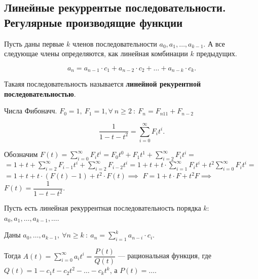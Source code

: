 
\subsection{Линейные рекуррентые последовательности. Регулярные производящие функции}


\begin{definition}

    Пусть даны первые $k$ членов последовательности $a_0, a_1, \dots, a_{k - 1}$.
    А все следующае члены определяются, как линейная комбинации $k$ предыдущих.

    \[a_n = a_{n-1} \cdot c_1 + a_{n-2} \cdot c_2 + \dots + a_{n-k} \cdot c_k. \]

    Такаяя последовательность называется \textbf{линейной рекурентной последовательностью}.
\end{definition}

\begin{example}
    Числа Фибоначч. $F_0 = 1, ~ F_1= 1, \forall ~ n \geqslant 2 ~:~ F_n = F_{n 1 1} + F_{n - 2}$

    \[
        \dfrac{1}{1 - t - t^2} = \sum_{i=0}^{\infty} F_i t^i.
    \]
\end{example}

Обозначим $F(t) = \sum\limits_{i=0}^\infty F_i t^i = F_0 t^0 + F_1 t^1 + \sum_{i=2}^\infty F_i t^i = $\\
$ = 1 + t + \sum_{i=2}^\infty F_{i-1} t^i + \sum_{i=2}^\infty F_{i-2} t^i = 1 + t + t \cdot \sum_{i=1}^\infty F_i t^i + t^2 \sum_{i = 0}^\infty F_i t^i = $\\
$ = 1 + t + t \cdot ( F(t) - 1 ) + t^2 \cdot F(t) \implies$
$F = 1 + t \cdot F + t^2 F \implies$\\
$F(t) = \dfrac{1}{1 - t  - t^2}$.

\begin{theorem}
    Пусть есть линейная рекуррентная последовательность порядка $k$:\\
     $a_0, a_1, \dots, a_{k-1}, \dots$.
    
    Даны $a_0, \dots, a_{k-1}, ~ \forall n \geqslant k~:~ a_n = \sum_{i = 1}^k a_{n-i} \cdot c_i$.

    Тогда $A(t) = \sum_{i=0}^\infty a_i t^i = \dfrac{P(t)}{Q(t)}$ --- рациональная функция, где \\
    $Q(t) = 1 - c_1 t - c_2 t^2 - \dots - c_{k} t^k$, а $P(t) = \dots$.
\end{theorem}

